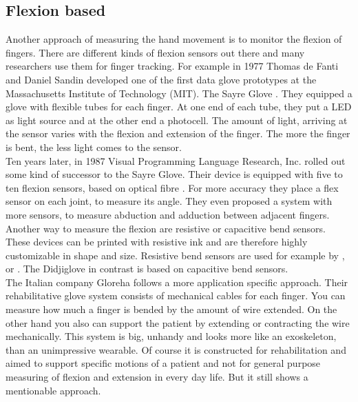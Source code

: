 \subsection{Flexion based} \label{subsec:approaches:flexion}
Another approach of measuring the hand movement is to monitor the flexion of fingers. There are different kinds of flexion sensors out there and many researchers use them for finger tracking. For example in 1977 Thomas de Fanti and Daniel Sandin developed one of the first data glove prototypes at the Massachusetts Institute of Technology (MIT). The Sayre Glove  \cite{sturman1994survey}. They equipped a glove with flexible tubes for each finger. At one end of each tube, they put a LED as light source and at the other end a photocell. The amount of light, arriving at the sensor varies with the flexion and extension of the finger. The more the finger is bent, the less light comes to the sensor.\\
Ten years later, in 1987 Visual Programming Language Research, Inc. rolled out some kind of successor to the Sayre Glove. Their device is equipped with five to ten flexion sensors, based on optical fibre \cite{zimmerman1985optical}. For more accuracy they place a flex sensor on each joint, to measure its angle. They even proposed a system with more sensors, to measure abduction and adduction between adjacent fingers.\\
Another way to measure the flexion are resistive or capacitive bend sensors. These devices can be printed with resistive ink and are therefore highly customizable in shape and size. Resistive bend sensors are used for example by \cite{o2013novel}, \cite{zecca2007development} or \cite{FifthDimension}. The Didjiglove \cite{sturman1994survey} in contrast is based on capacitive bend sensors.\\
The Italian company Gloreha \cite{Gloreha} follows a more application specific approach. Their rehabilitative glove system consists of mechanical cables for each finger. You can measure how much a finger is bended by the amount of wire extended. On the other hand you also can support the patient by extending or contracting the wire mechanically. This system is big, unhandy and looks more like an exoskeleton, than an unimpressive wearable. Of course it is constructed for rehabilitation and aimed to support specific motions of a patient and not for general purpose measuring of flexion and extension in every day life. But it still shows a mentionable approach.

